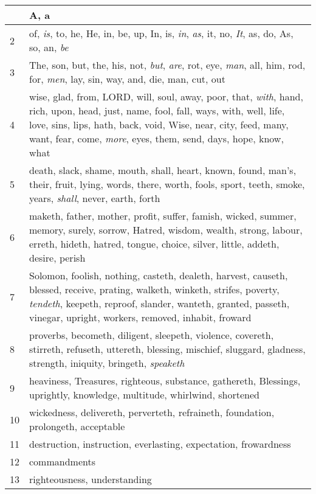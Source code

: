 \begin{center}
\begin{longtable}{l|p{3.75in}}
\hline \hline 
\endlastfoot 
1 & A, a\\ \hline 
2 & of, \emph{is}, to, he, He, in, be, up, In, is, \emph{in}, \emph{as}, it, no, \emph{It}, as, do, As, so, an, \emph{be}\\ \hline 
3 & The, son, but, the, his, not, \emph{but}, \emph{are}, rot, eye, \emph{man}, all, him, rod, for, \emph{men}, lay, sin, way, and, die, man, cut, out\\ \hline 
4 & wise, glad, from, LORD, will, soul, away, poor, that, \emph{with}, hand, rich, upon, head, just, name, fool, fall, ways, with, well, life, love, sins, lips, hath, back, void, Wise, near, city, feed, many, want, fear, come, \emph{more}, eyes, them, send, days, hope, know, what\\ \hline 
5 & death, slack, shame, mouth, shall, heart, known, found, man's, their, fruit, lying, words, there, worth, fools, sport, teeth, smoke, years, \emph{shall}, never, earth, forth\\ \hline 
6 & maketh, father, mother, profit, suffer, famish, wicked, summer, memory, surely, sorrow, Hatred, wisdom, wealth, strong, labour, erreth, hideth, hatred, tongue, choice, silver, little, addeth, desire, perish\\ \hline 
7 & Solomon, foolish, nothing, casteth, dealeth, harvest, causeth, blessed, receive, prating, walketh, winketh, strifes, poverty, \emph{tendeth}, keepeth, reproof, slander, wanteth, granted, passeth, vinegar, upright, workers, removed, inhabit, froward\\ \hline 
8 & proverbs, becometh, diligent, sleepeth, violence, covereth, stirreth, refuseth, uttereth, blessing, mischief, sluggard, gladness, strength, iniquity, bringeth, \emph{speaketh}\\ \hline 
9 & heaviness, Treasures, righteous, substance, gathereth, Blessings, uprightly, knowledge, multitude, whirlwind, shortened\\ \hline 
10 & wickedness, delivereth, perverteth, refraineth, foundation, prolongeth, acceptable\\ \hline 
11 & destruction, instruction, everlasting, expectation, frowardness\\ \hline 
12 & commandments\\ \hline 
13 & righteousness, understanding\\ \hline 
\end{longtable} 
\end{center} 




 
